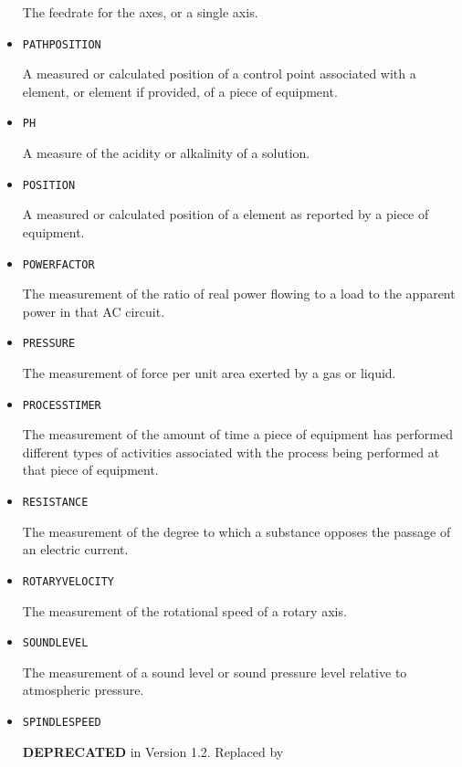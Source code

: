 \begin{itemize}
The feedrate for the axes, or a single axis.


\item \texttt{PATH\textunderscore POSITION}  

A measured or calculated position of a control point associated with a  element, or  element if provided, of a piece of equipment.


\item \texttt{PH}  

A measure of the acidity or alkalinity of a solution.


\item \texttt{POSITION}  

A measured or calculated position of a  element as reported by a piece of equipment.


\item \texttt{POWER\textunderscore FACTOR}  

The measurement of the ratio of real power flowing to a load to the apparent power in that AC circuit.


\item \texttt{PRESSURE}  

The measurement of force per unit area exerted by a gas or liquid.


\item \texttt{PROCESS\textunderscore TIMER}  

The measurement of the amount of time a piece of equipment has performed different types of activities associated with the process being performed at that piece of equipment.


\item \texttt{RESISTANCE}  

The measurement of the degree to which a substance opposes the passage of an electric current.


\item \texttt{ROTARY\textunderscore VELOCITY}  

The measurement of the rotational speed of a rotary axis.


\item \texttt{SOUND\textunderscore LEVEL}  

The measurement of a sound level or sound pressure level relative to atmospheric pressure.


\item \texttt{SPINDLE\textunderscore SPEED}  

\textbf{DEPRECATED} in Version 1.2.  Replaced by 



\end{itemize}
